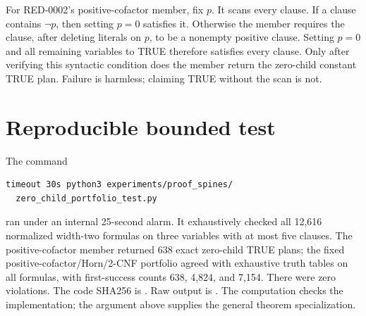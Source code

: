 \documentclass[11pt]{article}
\begin{document}
For RED-0002's positive-cofactor member, fix $p$.  It scans every clause.  If
a clause contains $\neg p$, then setting $p=0$ satisfies it.  Otherwise the
member requires the clause, after deleting literals on $p$, to be a nonempty
positive clause.  Setting $p=0$ and all remaining variables to TRUE therefore
satisfies every clause.  Only after verifying this syntactic condition does
the member return the zero-child constant TRUE plan.  Failure is harmless;
claiming TRUE without the scan is not.

\section{Reproducible bounded test}
The command
\begin{verbatim}
timeout 30s python3 experiments/proof_spines/
  zero_child_portfolio_test.py
\end{verbatim}
ran under an internal 25-second alarm.  It exhaustively checked all 12,616
normalized width-two formulas on three variables with at most five clauses.
The positive-cofactor member returned 638 exact zero-child TRUE plans; the
fixed positive-cofactor/Horn/2-CNF portfolio agreed with exhaustive truth
tables on all formulas, with first-success counts 638, 4,824, and 7,154.
There were zero violations.  The code SHA256 is
.
Raw output is
.
The computation checks the implementation; the argument above supplies the
general theorem specialization.
\end{document}

